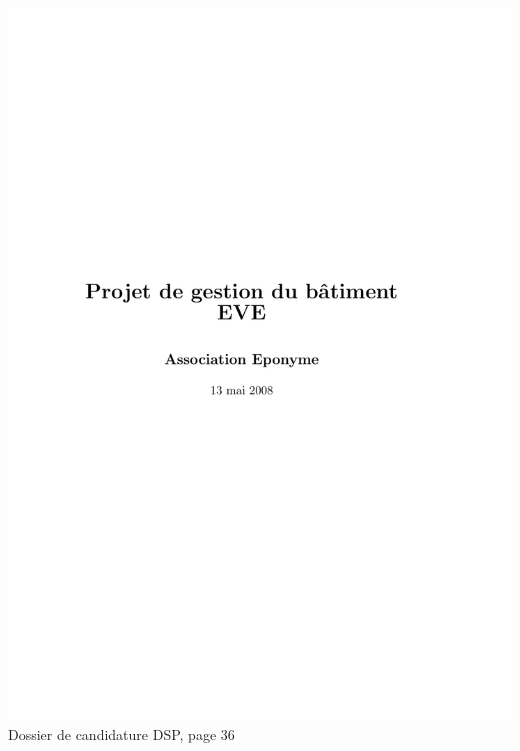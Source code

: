\includegraphics[scale=0.85,trim=20mm 20mm 20mm 20mm,clip,page=36]{annexes/candidature_dsp.pdf} \\
Dossier de candidature DSP, page 36
\newpage
